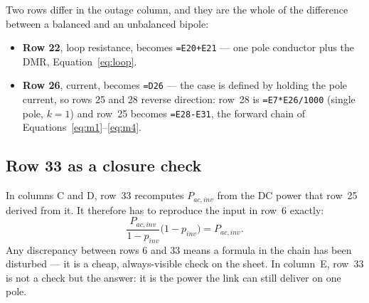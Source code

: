 Two rows differ in the outage column, and they are the whole of the difference
between a balanced and an unbalanced bipole:

\begin{itemize}\setlength{\itemsep}{0.3em}
  \item \textbf{Row 22}, loop resistance, becomes \texttt{=E20+E21} --- one pole
        conductor plus the DMR, Equation~\eqref{eq:loop}.
  \item \textbf{Row 26}, current, becomes \texttt{=D26} --- the case is defined
        by holding the pole current, so rows 25 and 28 reverse direction:
        row~28 is \texttt{=E7*E26/1000} (single pole, $k=1$) and row~25 becomes
        \texttt{=E28-E31}, the forward chain of
        Equations~\eqref{eq:m1}--\eqref{eq:m4}.
\end{itemize}

\subsection{Row 33 as a closure check}
In columns C and D, row~33 recomputes $P_{ac,inv}$ from the DC power that
row~25 derived from it. It therefore has to reproduce the input in row~6
exactly:
\[
  \frac{P_{ac,inv}}{1-p_{inv}}\bigl(1-p_{inv}\bigr) = P_{ac,inv}.
\]
Any discrepancy between rows 6 and 33 means a formula in the chain has been
disturbed --- it is a cheap, always-visible check on the sheet. In column~E,
row~33 is not a check but the answer: it is the power the link can still
deliver on one pole.
